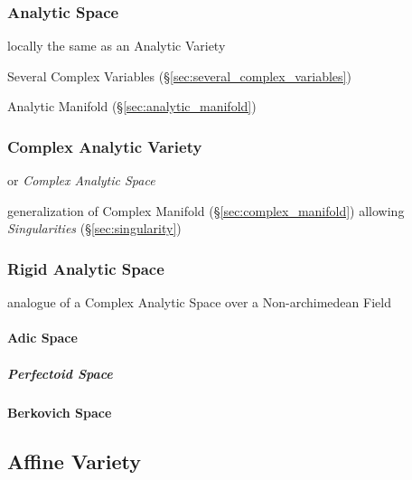 \subsubsection{Analytic Space}\label{sec:analytic_space}

locally the same as an Analytic Variety

Several Complex Variables (\S\ref{sec:several_complex_variables})

\fist Analytic Manifold (\S\ref{sec:analytic_manifold})




\subsubsection{Complex Analytic Variety}\label{sec:complex_variety}

or \emph{Complex Analytic Space}

generalization of Complex Manifold (\S\ref{sec:complex_manifold}) allowing
\emph{Singularities} (\S\ref{sec:singularity})



\subsubsection{Rigid Analytic Space}\label{sec:rigid_analytic_space}

analogue of a Complex Analytic Space over a Non-archimedean Field



\paragraph{Adic Space}\label{sec:adic_space}\hfill

\subparagraph{Perfectoid Space}\label{sec:perfectoid_space}\hfill



\paragraph{Berkovich Space}\label{sec:berkovich_space}\hfill



\subsection{Affine Variety}\label{sec:affine_variety}

